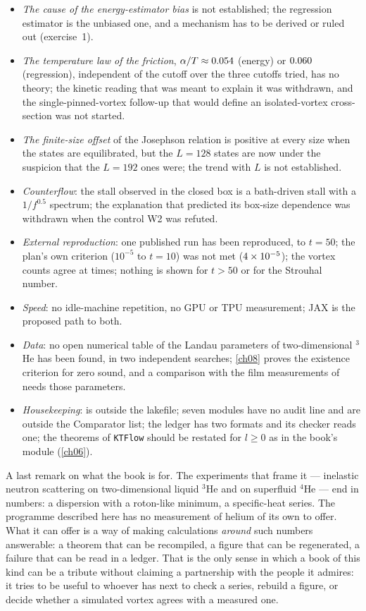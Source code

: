 \begin{itemize}[nosep]
\item \emph{The cause of the energy-estimator bias} is not established; the regression estimator is the unbiased one, and a mechanism has to be
  derived or ruled out (exercise~1).
\item \emph{The temperature law of the friction}, $\alpha/T\approx0.054$ (energy) or $0.060$ (regression), independent of the cutoff
  over the three cutoffs tried, has no theory; the kinetic reading that was meant to explain it was withdrawn, and the single-pinned-vortex
  follow-up that would define an isolated-vortex cross-section was not started.
\item \emph{The finite-size offset} of the Josephson relation is positive at every size when the states are equilibrated, but the $L=128$ states are
  now under the suspicion that the $L=192$ ones were; the trend with $L$ is not established.
\item \emph{Counterflow}: the stall observed in the closed box is a bath-driven stall with a $1/f^{0.5}$ spectrum; the explanation that predicted its box-size
  dependence was withdrawn when the control W2 was refuted.
\item \emph{External reproduction}: one published run has been reproduced, to $t=50$; the plan's own criterion ($10^{-5}$ to $t=10$) was not met
  ($4\times10^{-5}$); the vortex counts agree at \NxQKsCounts{} times; nothing is shown for $t>50$ or for the Strouhal number.
\item \emph{Speed}: no idle-machine repetition, no GPU or TPU measurement; JAX is the proposed path to both.
\item \emph{Data}: no open numerical table of the Landau parameters of two-dimensional $^3$He has been found, in two independent searches; \cref{ch08}
  proves the existence criterion for zero sound, and a comparison with the film measurements of \cite{Godfrin2012} needs those parameters.
\item \emph{Housekeeping}:  is outside the lakefile; seven modules have no audit line and are outside the Comparator list; the
  ledger has two formats and its checker reads one; the theorems of \texttt{KTFlow} should be restated for $l\ge0$ as in the book's module (\cref{ch06}).
\end{itemize}

A last remark on what the book is for. The experiments that frame it --- inelastic neutron scattering on two-dimensional liquid $^3$He \cite{Godfrin2012}
and on superfluid $^4$He \cite{Godfrin2021} --- end in numbers: a dispersion with a roton-like minimum, a specific-heat series. The programme described here
has no measurement of helium of its own to offer. What it can offer is a way of making calculations \emph{around} such numbers answerable: a theorem that can
be recompiled, a figure that can be regenerated, a failure that can be read in a ledger. That is the only sense in which a book of this kind can be a
tribute without claiming a partnership with the people it admires: it tries to be useful to whoever has next to check a series, rebuild a figure, or decide
whether a simulated vortex agrees with a measured one.

